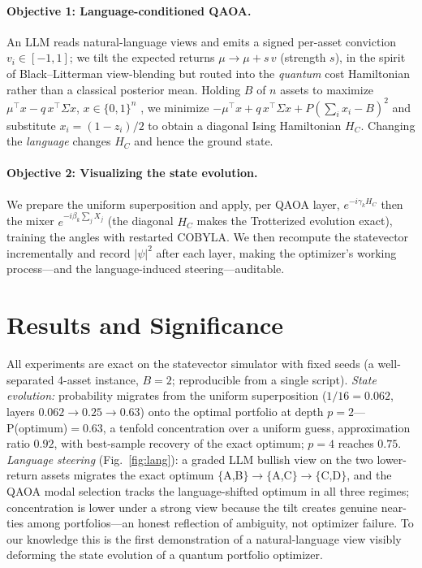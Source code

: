\documentclass[runningheads]{llncs}
\begin{document}
\paragraph{Objective 1: Language-conditioned QAOA.}
An LLM reads natural-language views and emits a signed per-asset conviction $v_i\in[-1,1]$; we tilt the
expected returns $\mu\to\mu+s\,v$ (strength $s$), in the spirit of Black--Litterman view-blending
\cite{black1992litterman} but routed into the \emph{quantum} cost Hamiltonian rather than a classical
posterior mean. Holding $B$ of $n$ assets to maximize $\mu^\top x-q\,x^\top\Sigma x$, $x\in\{0,1\}^n$
\cite{markowitz1952}, we minimize $-\mu^\top x+q\,x^\top\Sigma x+P(\sum_i x_i-B)^2$ and substitute
$x_i=(1-z_i)/2$ to obtain a diagonal Ising Hamiltonian $H_C$. Changing the \emph{language} changes $H_C$
and hence the ground state.

\paragraph{Objective 2: Visualizing the state evolution.}
We prepare the uniform superposition and apply, per QAOA layer, $e^{-i\gamma_k H_C}$ then the mixer
$e^{-i\beta_k\sum_j X_j}$ (the diagonal $H_C$ makes the Trotterized evolution exact), training the angles
with restarted COBYLA. We then recompute the statevector incrementally and record $|\psi|^2$ after each
layer, making the optimizer's working process---and the language-induced steering---auditable.

\section{Results and Significance}
All experiments are exact on the statevector simulator with fixed seeds (a well-separated 4-asset
instance, $B{=}2$; reproducible from a single script). \emph{State evolution:} probability migrates from
the uniform superposition ($1/16=0.062$, layers $0.062\to0.25\to0.63$) onto the optimal portfolio at
depth $p{=}2$---P(optimum)$=0.63$, a tenfold concentration over a uniform guess, approximation ratio
$0.92$, with best-sample recovery of the exact optimum; $p{=}4$ reaches $0.75$. \emph{Language steering}
(Fig.~\ref{fig:lang}): a graded LLM bullish view on the two lower-return assets migrates the exact optimum
$\{$A,B$\}\to\{$A,C$\}\to\{$C,D$\}$, and the QAOA modal selection tracks the language-shifted optimum in
all three regimes; concentration is lower under a strong view because the tilt creates genuine near-ties
among portfolios---an honest reflection of ambiguity, not optimizer failure. To our knowledge this is the
first demonstration of a natural-language view visibly deforming the state evolution of a quantum
portfolio optimizer.
\end{document}
